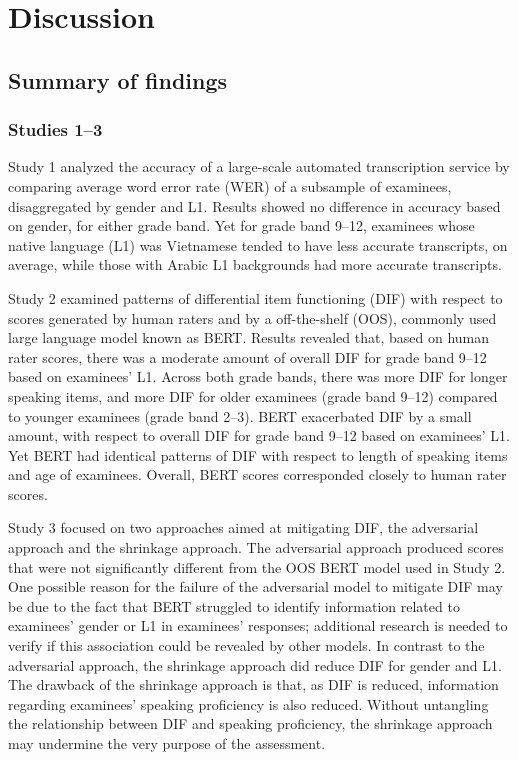 \documentclass [PhD] {uclathes}
\begin{document}
\chapter{Discussion}

\section{Summary of findings}

\subsection{Studies 1–3}

Study 1 analyzed the accuracy of a large-scale automated transcription service by comparing average word error rate (WER) of a subsample of examinees, disaggregated by gender and L1. Results showed no difference in accuracy based on gender, for either grade band. Yet for grade band 9–12, examinees whose native language (L1) was Vietnamese tended to have less accurate transcripts, on average, while those with Arabic L1 backgrounds had more accurate transcripts. 

Study 2 examined patterns of differential item functioning (DIF) with respect to scores generated by human raters and by a off-the-shelf (OOS), commonly used large language model known as BERT. Results revealed that, based on human rater scores, there was a moderate amount of overall DIF for grade band 9–12 based on examinees’ L1. Across both grade bands, there was more DIF for longer speaking items, and more DIF for older examinees (grade band 9–12) compared to younger examinees (grade band 2–3). BERT exacerbated DIF by a small amount, with respect to overall DIF for grade band 9–12 based on examinees’ L1. Yet BERT had identical patterns of DIF with respect to length of speaking items and age of examinees. Overall, BERT scores corresponded closely to human rater scores. 

Study 3 focused on two approaches aimed at mitigating DIF, the adversarial approach and the shrinkage approach. The adversarial approach produced scores that were not significantly different from the OOS BERT model used in Study 2. One possible reason for the failure of the adversarial model to mitigate DIF may be due to the fact that BERT struggled to identify information related to examinees’ gender or L1 in examinees’ responses; additional research is needed to verify if this association could be revealed by other models. In contrast to the adversarial approach, the shrinkage approach did reduce DIF for gender and L1. The drawback of the shrinkage approach is that, as DIF is reduced, information regarding examinees’ speaking proficiency is also reduced. Without untangling the relationship between DIF and speaking proficiency, the shrinkage approach may undermine the very purpose of the assessment. 
\end{document}
